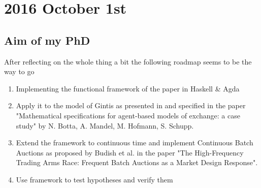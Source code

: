 \section*{2016 October 1st}
\subsection*{Aim of my PhD}
After reflecting on the whole thing a bit the following roadmap seems to be the way to go

\begin{enumerate}
\item Implementing the functional framework of the paper \cite{Botta20114025} in Haskell \& Agda
\item Apply it to the model of Gintis as presented in \cite{Gintis2006} and specified in the paper "Mathematical specifications for agent-based
models of exchange: a case study" by N. Botta, A. Mandel, M. Hofmann, S. Schupp.
\item Extend the framework to continuous time and implement Continuous Batch Auctions as proposed by Budish et al. in the paper "The High-Frequency Trading Arms Race: Frequent Batch Auctions as a Market Design Response".
\item Use framework to test hypotheses and verify them
\end{enumerate}
